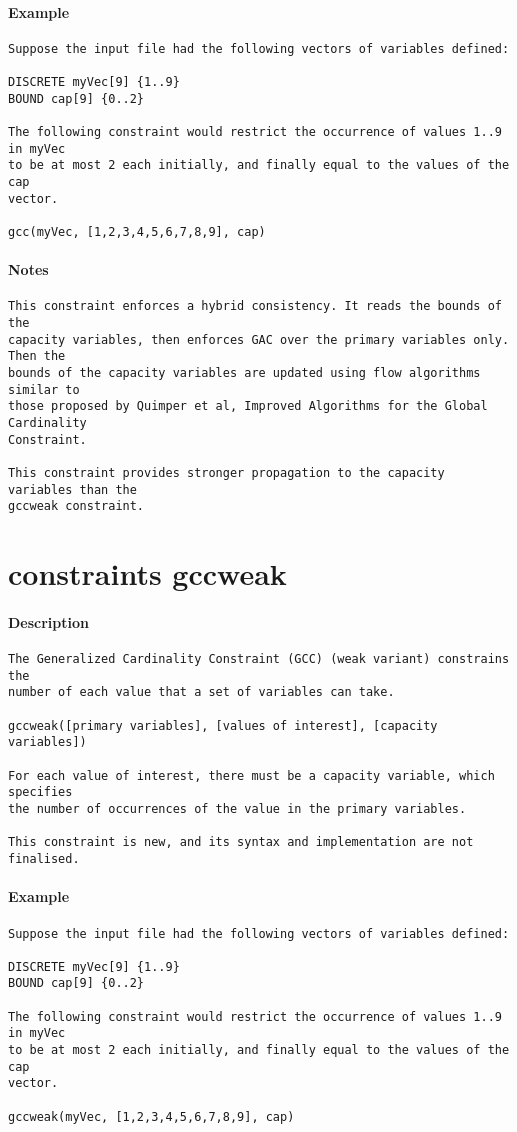 \paragraph{Example}
{\footnotesize
\begin{verbatim}
Suppose the input file had the following vectors of variables defined:

DISCRETE myVec[9] {1..9}
BOUND cap[9] {0..2}

The following constraint would restrict the occurrence of values 1..9 in myVec
to be at most 2 each initially, and finally equal to the values of the cap
vector.

gcc(myVec, [1,2,3,4,5,6,7,8,9], cap)
\end{verbatim}
}
\paragraph{Notes}
{\footnotesize
\begin{verbatim}
This constraint enforces a hybrid consistency. It reads the bounds of the
capacity variables, then enforces GAC over the primary variables only.  Then the
bounds of the capacity variables are updated using flow algorithms similar to
those proposed by Quimper et al, Improved Algorithms for the Global Cardinality
Constraint.

This constraint provides stronger propagation to the capacity variables than the
gccweak constraint.
\end{verbatim}
}
\section{constraints gccweak}
\paragraph{Description}
{\footnotesize
\begin{verbatim}
The Generalized Cardinality Constraint (GCC) (weak variant) constrains the 
number of each value that a set of variables can take.

gccweak([primary variables], [values of interest], [capacity variables])

For each value of interest, there must be a capacity variable, which specifies
the number of occurrences of the value in the primary variables.

This constraint is new, and its syntax and implementation are not finalised.
\end{verbatim}
}
\paragraph{Example}
{\footnotesize
\begin{verbatim}
Suppose the input file had the following vectors of variables defined:

DISCRETE myVec[9] {1..9}
BOUND cap[9] {0..2}

The following constraint would restrict the occurrence of values 1..9 in myVec
to be at most 2 each initially, and finally equal to the values of the cap
vector.

gccweak(myVec, [1,2,3,4,5,6,7,8,9], cap)
\end{verbatim}
}
